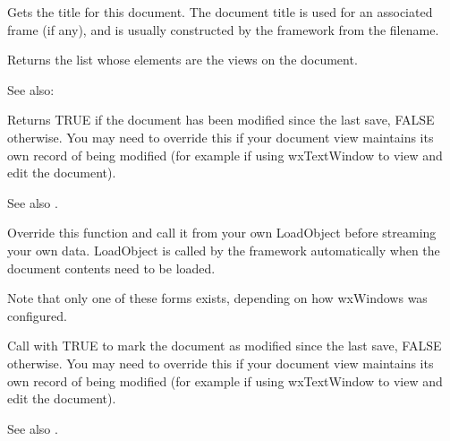 

Gets the title for this document. The document title is used for an associated
frame (if any), and is usually constructed by the framework from
the filename.

\label{wxdocumentgetviews}


Returns the list whose elements are the views on the document.

See also: 

\label{wxdocumentismodified}


Returns TRUE if the document has been modified since the last save, FALSE otherwise.
You may need to override this if your document view maintains its own
record of being modified (for example if using wxTextWindow to view and edit the document).

See also .




Override this function and call it from your own LoadObject before
streaming your own data. LoadObject is called by the framework
automatically when the document contents need to be loaded.

Note that only one of these forms exists, depending on how wxWindows
was configured.

\label{wxdocumentmodify}


Call with TRUE to mark the document as modified since the last save, FALSE otherwise.
You may need to override this if your document view maintains its own
record of being modified (for example if using wxTextWindow to view and edit the document).

See also .


